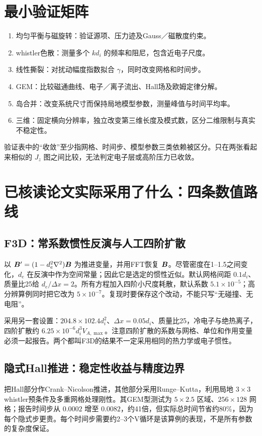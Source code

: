 \section{最小验证矩阵}
\begin{enumerate}
\item 均匀平衡与磁旋转：验证源项、压力迹及Gauss／磁散度约束。
\item whistler色散：测量多个 $kd_i$ 的频率和阻尼，包含近电子尺度。
\item 线性撕裂：对扰动幅度指数拟合 $\gamma$，同时改变网格和时间步。
\item GEM：比较磁通曲线、电子／离子流出、Hall场及欧姆定律分解。
\item 岛合并：改变系统尺寸而保持局地模型参数，测量峰值与时间平均率。
\item 三维：固定横向分辨率，独立改变第三维长度及模式数，区分二维限制与真实不稳定性。
\end{enumerate}
验证表中的“收敛”至少指网格、时间步、模型参数三类依赖被区分。只在两张看起来相似的 $J_z$ 图之间比较，无法判定电子层或高阶压力已收敛。

\section{已核读论文实际采用了什么：四条数值路线}
\subsection{F3D：常系数惯性反演与人工四阶扩散}
\citet{Shay2004}以 $\bm{B}'=(1-d_e^2\nabla^2)\bm{B}$ 为推进变量，并用FFT恢复 $\bm{B}$。尽管密度在1--1.5之间变化，$d_e$ 在反演中作为空间常量；因此它是选定的惯性近似。默认网格间距 $0.1d_i$、质量比25给 $d_e/\Delta x=2$。所有方程加入四阶小尺度耗散，默认系数 $5.1\times10^{-5}$；高分辨算例同时把它改为 $5\times10^{-7}$。复现时要保存这个改动，不能只写“无碰撞、无电阻”。

\citet{Cassak2008}采用另一套设置：$204.8\times102.4d_i^2$、$\Delta x=0.05d_i$、质量比25，冷电子与绝热离子，四阶扩散约 $6.25\times10^{-6}d_i^3V_{\!A,\max}$。注意四阶扩散的系数与网格、单位和作用变量必须一起报告。两个都叫F3D的结果不一定采用相同的热力学或电子惯性。

\subsection{隐式Hall推进：稳定性收益与精度边界}
\citet{Arnold2008}把Hall部分作Crank--Nicolson推进，其他部分采用Runge--Kutta，利用局地 $3\times3$ whistler预条件及多重网格处理刚性。其GEM型测试为 $5\times2.5$ 区域、$256\times128$ 网格；报告时间步从 $0.0002$ 增至 $0.0082$，约41倍，但实际总时间节省约80\%，因为每个隐式步更贵。每个时间步需要约2--3个V循环是该算例的表现，不是所有参数的复杂度保证。


